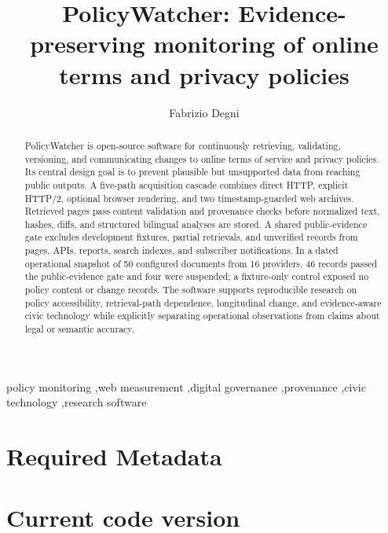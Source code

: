 \documentclass[preprint,12pt,a4paper]{elsarticle}
\begin{document}
\begin{frontmatter}

\title{PolicyWatcher: Evidence-preserving monitoring of online terms and privacy policies}

\author[gsom]{Fabrizio Degni}
\address[gsom]{POLIMI Graduate School of Management, Via Lambruschini 4/c, Building 26/a, 20156 Milan, Italy}

\begin{abstract}
PolicyWatcher is open-source software for continuously retrieving, validating,
versioning, and communicating changes to online terms of service and privacy
policies. Its central design goal is to prevent plausible but unsupported data
from reaching public outputs. A five-path acquisition cascade combines direct
HTTP, explicit HTTP/2, optional browser rendering, and two timestamp-guarded web
archives. Retrieved pages pass content validation and provenance checks before
normalized text, hashes, diffs, and structured bilingual analyses are stored. A
shared public-evidence gate excludes development fixtures, partial retrievals,
and unverified records from pages, APIs, reports, search indexes, and subscriber
notifications. In a dated operational snapshot of 50 configured documents from
16 providers, 46 records passed the public-evidence gate and four were suspended;
a fixture-only control exposed no policy content or change records. The software
supports reproducible research on policy accessibility, retrieval-path
dependence, longitudinal change, and evidence-aware civic technology while
explicitly separating operational observations from claims about legal or
semantic accuracy.
\end{abstract}

\begin{keyword}
policy monitoring \sep web measurement \sep digital governance \sep provenance
\sep civic technology \sep research software
\end{keyword}

\end{frontmatter}

\section*{Required Metadata}

\section*{Current code version}
\end{document}
